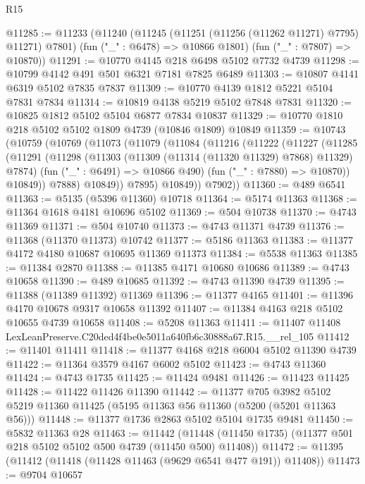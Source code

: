 \begin{lexlean}{R15}
\begin{coremodule}
{{{{{{{{{{{@11285 := @11233
    (@11240
      (@11245 (@11251 (@11256 (@11262 @11271) @7795) @11271) @7801)
      (fun ("_" : @6478) => @10866 @1801)
      (fun ("_" : @7807) => @10870))
@11291 := @10770 @4145 @218 @6498 @5102 @7732 @4739
@11298 := @10799 @4142 @491 @501 @6321 @7181 @7825 @6489
@11303 := @10807 @4141 @6319 @5102 @7835 @7837
@11309 := @10770 @4139 @1812 @5221 @5104 @7831 @7834
@11314 := @10819 @4138 @5219 @5102 @7848 @7831
@11320 := @10825 @1812 @5102 @5104 @6877 @7834 @10837
@11329 := @10770 @1810 @218 @5102 @5102 @1809 @4739 (@10846 @1809) @10849
@11359 := @10743
    (@10759
      (@10769
        (@11073
          (@11079
            (@11084
              (@11216
                (@11222
                  (@11227
                    (@11285
                      (@11291
                        (@11298
                          (@11303 (@11309 (@11314 (@11320 @11329) @7868) @11329) @7874)
                          (fun ("_" : @6491) => @10866 @490)
                          (fun ("_" : @7880) => @10870))
                        @10849))
                    @7888)
                  @10849))
              @7895)
            @10849))
        @7902))
@11360 := @489 @6541
@11363 := @5135 (@5396 @11360) @10718
@11364 := @5174 @11363
@11368 := @11364 @1618 @4181 @10696 @5102
@11369 := @504 @10738
@11370 := @4743 @11369
@11371 := @504 @10740
@11373 := @4743 @11371 @4739
@11376 := @11368 (@11370 @11373) @10742
@11377 := @5186 @11363
@11383 := @11377 @4172 @4180 @10687 @10695 @11369 @11373
@11384 := @5538 @11363
@11385 := @11384 @2870
@11388 := @11385 @4171 @10680 @10686
@11389 := @4743 @10658
@11390 := @489 @10685
@11392 := @4743 @11390 @4739
@11395 := @11388 (@11389 @11392) @11369
@11396 := @11377 @4165
@11401 := @11396 @4170 @10678 @9317 @10658 @11392
@11407 := @11384 @4163 @218 @5102 @10655 @4739 @10658
@11408 := @5208 @11363
@11411 := @11407 @11408 LexLeanPreserve.C20ded4f4be0e5011a640fb6c30888a67.R15.__rel_105
@11412 := @11401 @11411
@11418 := @11377 @4168 @218 @6004 @5102 @11390 @4739
@11422 := @11364 @3579 @4167 @6002 @5102
@11423 := @4743 @11360
@11424 := @4743 @1735
@11425 := @11424 @9481
@11426 := @11423 @11425
@11428 := @11422 @11426 @11390
@11442 := @11377
    @705
    @3982
    @5102
    @5219
    @11360
    @11425
    (@5195 @11363 @56 @11360 (@5200 (@5201 @11363 @56)))
@11448 := @11377 @1736 @2863 @5102 @5104 @1735 @9481
@11450 := @5832 @11363 @28
@11463 := @11442
    (@11448 (@11450 @1735) (@11377 @501 @218 @5102 @5102 @500 @4739 (@11450 @500) @11408))
@11472 := @11395 (@11412 (@11418 (@11428 @11463 (@9629 @6541 @477 @191)) @11408))
@11473 := @9704 @10657
}}}}}}}}}}}
\end{coremodule}
\end{lexlean}
